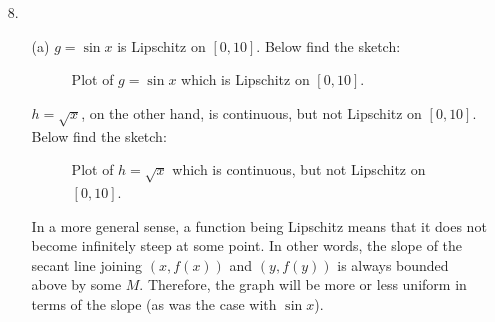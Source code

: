 \documentclass[11pt]{article}
\begin{document}
\begin{itemize}
    \item[8.]
        \begin{itemize}
            \item[(a)]
                $g = \sin{x}$ is Lipschitz on $[0, 10]$. Below find the sketch:

                \begin{figure}[H]
                    \centering
                    \caption{Plot of $g = \sin{x}$ which is Lipschitz on $[0, 10]$.}
                \end{figure}

                $h = \sqrt{x}$, on the other hand, is continuous, but not
                Lipschitz on $[0, 10]$. Below find the sketch:

                \begin{figure}[H]
                    \centering
                    \caption{Plot of $h = \sqrt{x}$ which is continuous, but
                    not Lipschitz on $[0, 10]$.}
                \end{figure}

                In a more general sense, a function being Lipschitz means that
                it does not become infinitely steep at some point. In other
                words, the slope of the secant line joining $(x, f(x))$ and
                $(y, f(y))$ is always bounded above by some $M$. Therefore, the
                graph will be more or less uniform in terms of the slope (as
                was the case with $\sin{x}$).


\end{itemize}
\end{itemize}
\end{document}
